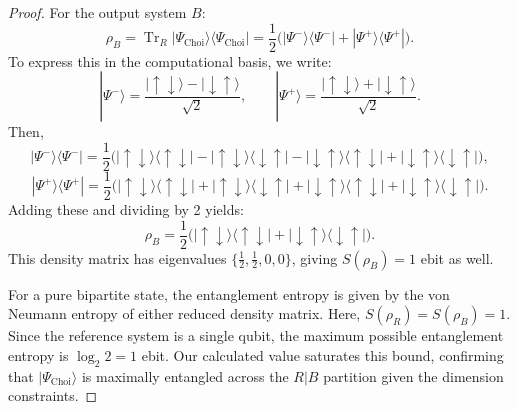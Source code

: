 \documentclass[10pt,a4paper]{amsart}
\begin{document}
\begin{proof}
For the output system $B$:
\[
\rho_B = \operatorname{Tr}_R |\Psi_{\mathrm{Choi}}\rangle\langle\Psi_{\mathrm{Choi}}|
= \frac{1}{2}\bigl( |\Psi^-\rangle\langle\Psi^-| + |\Psi^+\rangle\langle\Psi^+| \bigr).
\]
To express this in the computational basis, we write:
\[
|\Psi^-\rangle = \frac{|\uparrow\downarrow\rangle-|\downarrow\uparrow\rangle}{\sqrt{2}}, \qquad
|\Psi^+\rangle = \frac{|\uparrow\downarrow\rangle+|\downarrow\uparrow\rangle}{\sqrt{2}}.
\]
Then,
\[
|\Psi^-\rangle\langle\Psi^-| = \frac{1}{2}\bigl(|\uparrow\downarrow\rangle\langle\uparrow\downarrow| - |\uparrow\downarrow\rangle\langle\downarrow\uparrow| - |\downarrow\uparrow\rangle\langle\uparrow\downarrow| + |\downarrow\uparrow\rangle\langle\downarrow\uparrow|\bigr),
\]
\[
|\Psi^+\rangle\langle\Psi^+| = \frac{1}{2}\bigl(|\uparrow\downarrow\rangle\langle\uparrow\downarrow| + |\uparrow\downarrow\rangle\langle\downarrow\uparrow| + |\downarrow\uparrow\rangle\langle\uparrow\downarrow| + |\downarrow\uparrow\rangle\langle\downarrow\uparrow|\bigr).
\]
Adding these and dividing by 2 yields:
\[
\rho_B = \frac{1}{2}\bigl( |\uparrow\downarrow\rangle\langle\uparrow\downarrow| + |\downarrow\uparrow\rangle\langle\downarrow\uparrow| \bigr).
\]
This density matrix has eigenvalues $\{\tfrac12, \tfrac12, 0, 0\}$, giving $S(\rho_B) = 1$ ebit as well.



For a pure bipartite state, the entanglement entropy is given by the von Neumann entropy of either reduced density matrix. Here, $S(\rho_R) = S(\rho_B) = 1$. Since the reference system is a single qubit, the maximum possible entanglement entropy is $\log_2 2 = 1$ ebit. Our calculated value saturates this bound, confirming that $|\Psi_{\mathrm{Choi}}\rangle$ is maximally entangled across the $R|B$ partition given the dimension constraints.
\end{proof}
\end{document}
